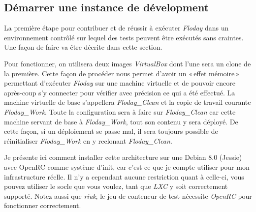 \subsection{Démarrer une instance de dévelopment}

La première étape pour contribuer et de réussir à exécuter \emph{Floday} dans un environnement contrôlé sur lequel des tests peuvent être exécutés sans craintes.
Une façon de faire va être décrite dans cette section.

Pour fonctionner, on utilisera deux images \emph{VirtualBox} dont l'une sera un clone de la première.
Cette façon de procéder nous permet d'avoir un «\,effet mémoire\,» permettant d'exécuter \emph{Floday} sur une machine virtuelle et de pouvoir encore après-coup s'y connecter pour vérifier avec précision ce qui a été effectué.
La machine virtuelle de base s'appellera \emph{Floday\_Clean} et la copie de travail courante \emph{Floday\_Work}.
Toute la configuration sera à faire sur \emph{Floday\_Clean} car cette machine servant de base à \emph{Floday\_Work}, tout son contenu y sera déployé.
De cette façon, si un déploiement se passe mal, il sera toujours possible de réinitialiser \emph{Floday\_Work} en y reclonant \emph{Floday\_Clean}.

Je présente ici comment installer cette architecture sur une Debian 8.0 (Jessie) avec OpenRC comme système d'init, car c'est ce que je compte utiliser pour mon infrastructure réelle.
Il n'y a cependant aucune restriction quant à celle-ci, vous pouvez utiliser le socle que vous voulez, tant que \emph{LXC} y soit correctement supporté.
Notez aussi que \emph{riuk}, le jeu de conteneur de test nécessite \emph{OpenRC} pour fonctionner correctement.


